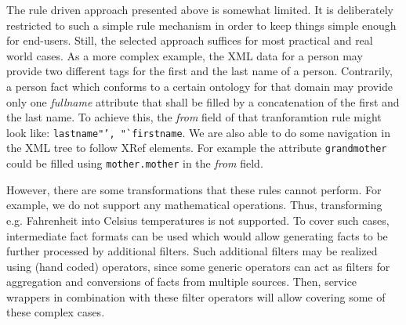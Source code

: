 \documentclass{fast_latex}
\begin{document}
The rule driven approach presented above is somewhat limited. It is deliberately restricted to such a simple rule mechanism in order to keep things simple enough for end-users. Still, the selected approach suffices for most practical and real world cases. As a more complex example, the XML data for a person may provide two different tags for the first and the last name of a person. Contrarily, a person fact which conforms to a certain ontology for that domain may provide only one \emph{fullname} attribute that shall be filled by a concatenation of the first and the last name. To achieve this, the \textit{from} field of that tranforamtion rule might look like: \texttt{lastname"', "`firstname}. We are also able to do some navigation in the XML tree to follow XRef elements. For example the attribute \texttt{grandmother} could be filled using \texttt{mother.mother} in the \textit{from} field. 

However, there are some transformations that these rules cannot perform. For example, we do not support any mathematical operations. Thus, transforming e.g. Fahrenheit into Celsius temperatures is not supported. To cover such  cases, intermediate fact formats can be used which would allow generating facts to be further processed by additional filters. Such additional filters may be realized using (hand coded) operators, since some generic operators can act as filters for aggregation and conversions of facts from multiple sources. Then, service wrappers in combination with these filter operators will allow covering some of these complex cases.



\clearpage


\end{document}
